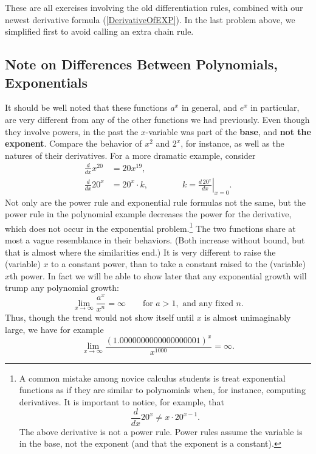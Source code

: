 These are all exercises involving the old differentiation rules,
combined with our newest derivative formula (\ref{DerivativeOfEXP}).
In the last problem above, we simplified first to avoid calling
an extra chain rule.

\subsection{Note on Differences Between Polynomials, Exponentials}
It should be well noted that these functions $a^x$ in general,
and $e^x$ in particular, are very different from
any of the other functions we had previously.  Even though
they involve powers, in the past the $x$-variable was
part of the {\bf base}, and {\bf not the exponent}.
Compare the behavior of $x^2$ and $2^x$, for instance,
as well as the natures of their derivatives.
For a more dramatic example, consider
\begin{align*}
\frac{d}{dx}x^{20}&=20x^{19},\\
\frac{d}{dx}20^x  &=20^x\cdot k,\qquad\qquad k=\left.\frac{d\,20^x}{dx}
         \right|_{x=0}.
\end{align*}
Not only are the power rule and exponential rule formulas not
the same, but the power rule in the polynomial
example decreases the power for the derivative, which does
not occur in the exponential problem.\footnote{%
A common mistake among novice calculus students
is treat exponential functions as if they are similar to polynomials
when, for instance, computing derivatives.
It is important to notice, for example, that
$$\frac{d}{dx}20^x\ne x\cdot 20^{x-1}.$$
The above derivative is not a power rule.  Power rules
assume the variable is in the base, not the exponent
(and that the exponent is a constant).
}  The two functions share at most a vague resemblance in their
behaviors.  (Both increase without bound, but that is almost where
the similarities end.)
It is very different to raise the (variable) $x$ to a constant power, than to
take a constant raised to the (variable) $x$th power.
In fact we will be able to show later that any 
exponential growth will trump any polynomial growth:
\begin{equation}\lim_{x\to\infty}\frac{a^x}{x^n}=\infty\qquad \text{for }a>1,
    \text{ and any fixed }n.\label{LimitA^X/X^NAsXToInfty}
\end{equation}
Thus, though the trend would not show itself until $x$ is 
almost unimaginably large,
we have for example
$$\lim_{x\to\infty}\frac{(1.0000000000000000001)^x}{x^{1000}}=\infty.$$
